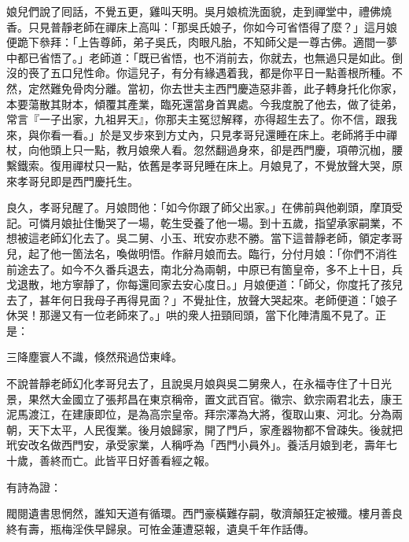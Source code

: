 娘兒們說了囘話，不覺五更，雞叫天明。吳月娘梳洗面貌，走到禪堂中，禮佛燒香。只見普靜老師在禪床上高叫：「那吳氏娘子，你如今可省悟得了麼？」這月娘便跪下叅拜：「上告尊師，弟子吳氏，肉眼凡胎，不知師父是一尊古佛。適間一夢中都已省悟了。」{}老師道：「既已省悟，也不消前去，你就去，也無過只是如此。倒沒的䘮了五口兒性命。你這兒子，有分有緣遇着我，都是你平日一點善根所種。不然，定然難免骨肉分離。當初，你去世夫主西門慶造惡非善，此子轉身托化你家，本要蕩散其財本，傾覆其產業，臨死還當身首異處。{}今我度脫了他去，做了徒弟，常言『一子出家，九祖昇天』，你那夫主冤愆解釋，亦得超生去了。你不信，跟我來，與你看一看。」於是叉步來到方丈內，只見孝哥兒還睡在床上。老師將手中禪杖，向他頭上只一點，教月娘衆人看。忽然翻過身來，卻是西門慶，項帶沉枷，腰繫鐵索。{}復用禪杖只一點，依舊是孝哥兒睡在床上。月娘見了，不覺放聲大哭，原來孝哥兒即是西門慶托生。{}

良久，孝哥兒醒了。月娘問他：「如今你跟了師父出家。」在佛前與他剃頭，摩頂受記。可憐月娘扯住慟哭了一場，乾生受養了他一場。到十五歲，指望承家嗣業，不想被這老師幻化去了。{}吳二舅、小玉、玳安亦悲不勝。當下這普靜老師，領定孝哥兒，起了他一箇法名，喚做明悟。{}作辭月娘而去。臨行，分付月娘：「你們不消徃前途去了。如今不久番兵退去，南北分為兩朝，中原已有箇皇帝，多不上十日，兵戈退散，地方寧靜了，你每還囘家去安心度日。」月娘便道：「師父，你度托了孩兒去了，甚年何日我母子再得見面？」不覺扯住，放聲大哭起來。老師便道：「娘子休哭！那邊又有一位老師來了。」哄的衆人扭頸囘頭，當下化陣清風不見了。正是：

三降塵寰人不識，倏然飛過岱東峰。

不說普靜老師幻化孝哥兒去了，且說吳月娘與吳二舅衆人，在永福寺住了十日光景，果然大金國立了張邦昌在東京稱帝，置文武百官。徽宗、欽宗兩君北去，康王泥馬渡江，在建康即位，是為高宗皇帝。拜宗澤為大將，復取山東、河北。分為兩朝，天下太平，人民復業。後月娘歸家，開了門戶，家產器物都不曾疎失。後就把玳安改名做西門安，承受家業，人稱呼為「西門小員外」。{}養活月娘到老，壽年七十歲，善終而亡。此皆平日好善看經之報。

有詩為證：

閥閱遺書思惘然，誰知天道有循環。西門豪橫難存嗣，敬濟顛狂定被殲。樓月善良終有壽，瓶梅淫佚早歸泉。可恠金蓮遭惡報，遺臭千年作話傳。


